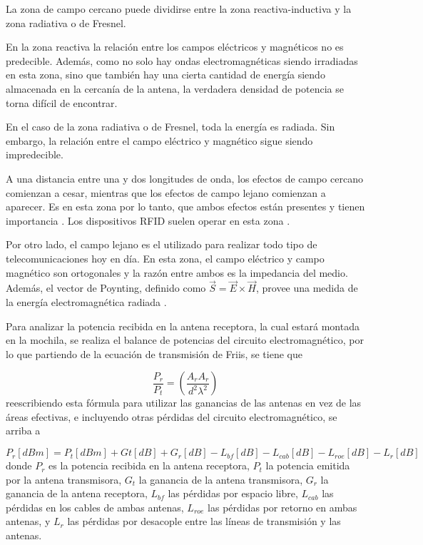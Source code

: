 La zona de campo cercano puede dividirse entre la zona reactiva-inductiva y la zona radiativa o de Fresnel. 

En la zona reactiva la relación entre los campos eléctricos y magnéticos no es predecible. Además, como no solo hay ondas electromagnéticas siendo irradiadas en esta zona, sino que también hay una cierta cantidad de energía siendo almacenada en la cercanía de la antena, la verdadera densidad de potencia se torna difícil de encontrar.

En el caso de la zona radiativa o de Fresnel, toda la energía es radiada. Sin embargo, la relación entre el campo eléctrico y magnético sigue siendo impredecible.

A una distancia entre una y dos longitudes de onda, los efectos de campo cercano comienzan a cesar, mientras que los efectos de campo lejano comienzan a aparecer. Es en esta zona por lo tanto, que ambos efectos están presentes y tienen importancia \cite{ref:NearFieldVsFarField}. Los dispositivos RFID suelen operar en esta zona \cite{ref:NearFieldUHFRFID}.

Por otro lado, el campo lejano es el utilizado para realizar todo tipo de telecomunicaciones hoy en día. En esta zona, el campo eléctrico y campo magnético son ortogonales y la razón entre ambos es la impedancia del medio. Además, el vector de Poynting, definido como $\vec{S} = \vec{E}\times \vec{H}$, provee una medida de la energía electromagnética radiada \cite{ref:PhysicsOscillations}.

Para analizar la potencia recibida en la antena receptora, la cual estará montada en la mochila, se realiza el balance de potencias del circuito electromagnético, por lo que partiendo de la ecuación de transmisión de Friis, se tiene que

\begin{equation}
\frac{P_r}{P_t} = \left( \frac{A_rA_r}{d^2\lambda ^2} \right)
\end{equation}
reescribiendo esta fórmula para utilizar las ganancias de las antenas en vez de las áreas efectivas, e incluyendo otras pérdidas del circuito electromagnético, se arriba a

\begin{equation}
P_r[dBm] = P_t[dBm] + Gt[dB] + G_r[dB] - L_{bf}[dB] - L_{cab}[dB] - L_{roe}[dB] - L_{r}[dB]
\end{equation}
donde $P_r$ es la potencia recibida en la antena receptora, $P_t$ la potencia emitida por la antena transmisora, $G_t$ la ganancia de la antena transmisora, $G_r$ la ganancia de la antena receptora, $L_{bf}$ las pérdidas por espacio libre, $L_{cab}$ las pérdidas en los cables de ambas antenas, $L_{roe}$ las pérdidas por retorno en ambas antenas, y $L_{r}$ las pérdidas por desacople entre las líneas de transmisión y las antenas.

